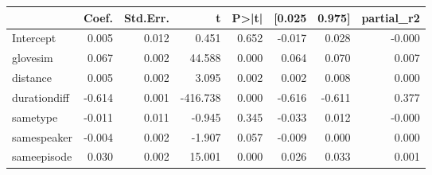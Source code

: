 \begin{tabular}{lrrrrrrr}
\toprule
{} &  Coef. &  Std.Err. &        t &  P>|t| &  [0.025 &  0.975] &  partial\_r2 \\
\midrule
Intercept    &  0.005 &     0.012 &    0.451 &  0.652 &  -0.017 &   0.028 &      -0.000 \\
glovesim     &  0.067 &     0.002 &   44.588 &  0.000 &   0.064 &   0.070 &       0.007 \\
distance     &  0.005 &     0.002 &    3.095 &  0.002 &   0.002 &   0.008 &       0.000 \\
durationdiff & -0.614 &     0.001 & -416.738 &  0.000 &  -0.616 &  -0.611 &       0.377 \\
sametype     & -0.011 &     0.011 &   -0.945 &  0.345 &  -0.033 &   0.012 &      -0.000 \\
samespeaker  & -0.004 &     0.002 &   -1.907 &  0.057 &  -0.009 &   0.000 &       0.000 \\
sameepisode  &  0.030 &     0.002 &   15.001 &  0.000 &   0.026 &   0.033 &       0.001 \\
\bottomrule
\end{tabular}

